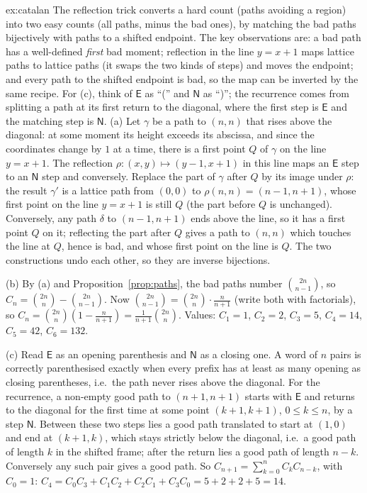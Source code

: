 \begin{solution}{ex:catalan}
\idea The reflection trick converts a hard count (paths avoiding a region) into two easy counts (all paths, minus the bad ones), by matching the bad paths bijectively with paths to a shifted endpoint. The key observations are: a bad path has a well-defined \emph{first} bad moment; reflection in the line $y=x+1$ maps lattice paths to lattice paths (it swaps the two kinds of steps) and moves the endpoint; and every path to the shifted endpoint is bad, so the map can be inverted by the same recipe. For (c), think of $\mathsf E$ as ``('' and $\mathsf N$ as ``)''; the recurrence comes from splitting a path at its first return to the diagonal, where the first step is $\mathsf E$ and the matching step is $\mathsf N$.
\writeup (a) Let $\gamma$ be a path to $(n,n)$ that rises above the diagonal: at some moment its height exceeds its abscissa, and since the coordinates change by $1$ at a time, there is a first point $Q$ of $\gamma$ on the line $y=x+1$. The reflection $\rho:(x,y)\mapsto(y-1,x+1)$ in this line maps an $\mathsf E$ step to an $\mathsf N$ step and conversely. Replace the part of $\gamma$ after $Q$ by its image under $\rho$: the result $\gamma'$ is a lattice path from $(0,0)$ to $\rho(n,n)=(n-1,n+1)$, whose first point on the line $y=x+1$ is still $Q$ (the part before $Q$ is unchanged). Conversely, any path $\delta$ to $(n-1,n+1)$ ends above the line, so it has a first point $Q$ on it; reflecting the part after $Q$ gives a path to $(n,n)$ which touches the line at $Q$, hence is bad, and whose first point on the line is $Q$. The two constructions undo each other, so they are inverse bijections.

(b) By (a) and Proposition~\ref{prop:paths}, the bad paths number $\binom{2n}{n-1}$, so $C_n=\binom{2n}n-\binom{2n}{n-1}$. Now
$\binom{2n}{n-1}=\binom{2n}n\cdot\frac{n}{n+1}$ (write both with factorials), so $C_n=\binom{2n}n\left(1-\frac n{n+1}\right)=\frac1{n+1}\binom{2n}n$.
Values: $C_1=1$, $C_2=2$, $C_3=5$, $C_4=14$, $C_5=42$, $C_6=132$.

(c) Read $\mathsf E$ as an opening parenthesis and $\mathsf N$ as a closing one. A word of $n$ pairs is correctly parenthesised exactly when every prefix has at least as many opening as closing parentheses, i.e.\ the path never rises above the diagonal. For the recurrence, a non-empty good path to $(n+1,n+1)$ starts with $\mathsf E$ and returns to the diagonal for the first time at some point $(k+1,k+1)$, $0\le k\le n$, by a step $\mathsf N$. Between these two steps lies a good path translated to start at $(1,0)$ and end at $(k+1,k)$, which stays strictly below the diagonal, i.e.\ a good path of length $k$ in the shifted frame; after the return lies a good path of length $n-k$. Conversely any such pair gives a good path. So $C_{n+1}=\sum_{k=0}^nC_kC_{n-k}$, with $C_0=1$: $C_4=C_0C_3+C_1C_2+C_2C_1+C_3C_0=5+2+2+5=14$.
\end{solution}


